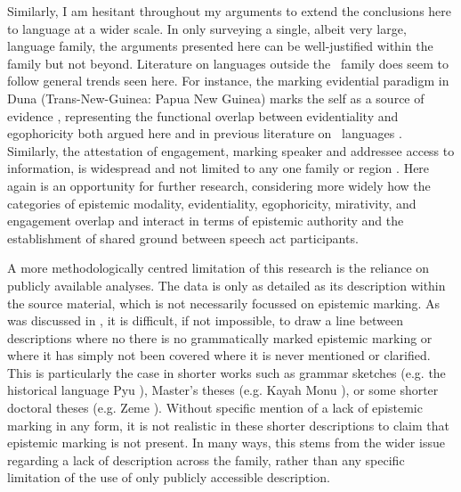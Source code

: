 Similarly, I am hesitant throughout my arguments to extend the conclusions here to language at a wider scale. In only surveying a single, albeit very large, language family, the arguments presented here can be well-justified within the family but not beyond. Literature on languages outside the \lfam\ family does seem to follow general trends seen here. For instance, the marking evidential paradigm in Duna (Trans-New-Guinea: Papua New Guinea) marks the self as a source of evidence \cite{SanRoque2012}, representing the functional overlap between evidentiality and egophoricity both argued here and in previous literature on \lfam\ languages \cites{Gawne2017}{Hill2020}. Similarly, the attestation of engagement, marking speaker and addressee access to information, is widespread and not limited to any one family or region \cite{EvansBergqvistSanRoque2018a}. Here again is an opportunity for further research, considering more widely how the categories of epistemic modality, evidentiality, egophoricity, mirativity, and engagement overlap and interact in terms of epistemic authority and the establishment of shared ground between speech act participants.

A more methodologically centred limitation of this research is the reliance on publicly available analyses. The data is only as detailed as its description within the source material, which is not necessarily focussed on epistemic marking. As was discussed in , it is difficult, if not impossible, to draw a line between descriptions where no there is no grammatically marked epistemic marking or where it has simply not been covered where it is never mentioned or clarified. This is particularly the case in shorter works such as grammar sketches (e.g. the historical language Pyu \cite[Subfamily Unclear: Myanmar,][]{Miyake2019}), Master's theses (e.g. Kayah Monu \cite[Karenic: Myanmar,][]{Aung2013}), or some shorter doctoral theses (e.g. Zeme \cite[Zeme subfamily: India,][]{Chanu2017}). Without specific mention of a lack of epistemic marking in any form, it is not realistic in these shorter descriptions to claim that epistemic marking is not present. In many ways, this stems from the wider issue regarding a lack of description across the family, rather than any specific limitation of the use of only publicly accessible description.

